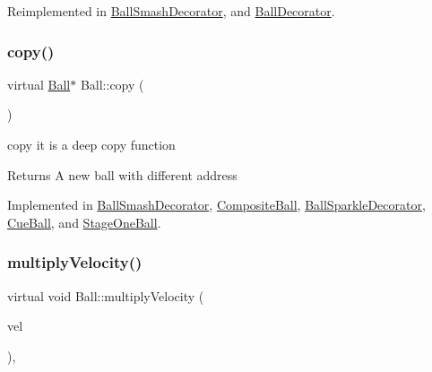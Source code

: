 Reimplemented in \mbox{\hyperlink{class_ball_smash_decorator_ad59848156e8eabad3e561a1d113f7029}{Ball\+Smash\+Decorator}}, and \mbox{\hyperlink{class_ball_decorator_a3e4f4d31f6409f018b8b337bcf2bd284}{Ball\+Decorator}}.

\mbox{\label{class_ball_ae6c0731fabb7a45ba36df62a1975661a}} 
\subsubsection{\texorpdfstring{copy()}{copy()}}
{\footnotesize\ttfamily virtual \mbox{\hyperlink{class_ball}{Ball}}$\ast$ Ball\+::copy (\begin{DoxyParamCaption}{ }\end{DoxyParamCaption})\hspace{0.3cm}{\ttfamily [pure virtual]}}



copy it is a deep copy function 

\begin{DoxyReturn}{Returns}
A new ball with different address 
\end{DoxyReturn}


Implemented in \mbox{\hyperlink{class_ball_smash_decorator_ab5efc4c2f676224223940a7a4f7dcd77}{Ball\+Smash\+Decorator}}, \mbox{\hyperlink{class_composite_ball_ad00585e160c3b030435d567141574fd2}{Composite\+Ball}}, \mbox{\hyperlink{class_ball_sparkle_decorator_a1fd1b10d028cc51c958eb5c9a7cf732c}{Ball\+Sparkle\+Decorator}}, \mbox{\hyperlink{class_cue_ball_a9c2d69ffe6892cba695ef34e360b5dae}{Cue\+Ball}}, and \mbox{\hyperlink{class_stage_one_ball_a8c75b7d3f7e84bc95cbdce60f030787e}{Stage\+One\+Ball}}.

\mbox{\label{class_ball_aacc57301046fab52930f7615073136e0}} 
\subsubsection{\texorpdfstring{multiply\+Velocity()}{multiplyVelocity()}}
{\footnotesize\ttfamily virtual void Ball\+::multiply\+Velocity (\begin{DoxyParamCaption}\item[{const Q\+Vector2D \&}]{vel }\end{DoxyParamCaption})\hspace{0.3cm}{\ttfamily [inline]}, {\ttfamily [virtual]}}



